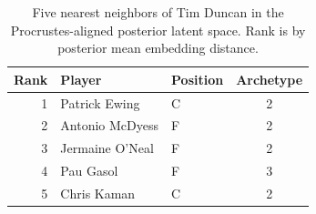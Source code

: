 \begin{table}[htbp]
  \centering\small
  \begin{tabular}{rllc}
    \toprule
    Rank & Player & Position & Archetype \\
    \midrule
    1 & Patrick Ewing & C & 2 \\
    2 & Antonio McDyess & F & 2 \\
    3 & Jermaine O'Neal & F & 2 \\
    4 & Pau Gasol & F & 3 \\
    5 & Chris Kaman & C & 2 \\
    \bottomrule
  \end{tabular}
  \caption{Five nearest neighbors of Tim Duncan in the Procrustes-aligned posterior latent space. Rank is by posterior mean embedding distance.}
  \label{tab:Tim_Duncan_neighbors}
\end{table}

